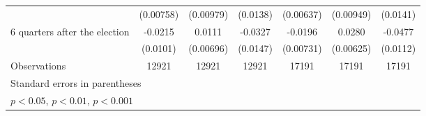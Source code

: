 \begin{table}[htbp]
\begin{tabular}{l*{6}{c}}
                    &   (0.00758)         &   (0.00979)         &    (0.0138)         &   (0.00637)         &   (0.00949)         &    (0.0141)         \\
[1em]
 6 quarters after the election&     -0.0215\sym{*}  &      0.0111         &     -0.0327\sym{*}  &     -0.0196\sym{**} &      0.0280\sym{***}&     -0.0477\sym{***}\\
                    &    (0.0101)         &   (0.00696)         &    (0.0147)         &   (0.00731)         &   (0.00625)         &    (0.0112)         \\
\hline
Observations        &       12921         &       12921         &       12921         &       17191         &       17191         &       17191         \\
\hline\hline
\multicolumn{7}{l}{\footnotesize Standard errors in parentheses}\\
\multicolumn{7}{l}{\footnotesize \sym{*} \(p<0.05\), \sym{**} \(p<0.01\), \sym{***} \(p<0.001\)}\\
\end{tabular}
\end{table}

